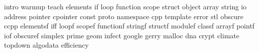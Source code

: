 intro
warmup
teach
elements
if
loop
function
scope
struct
object
array
string
io
address
pointer
cpointer
const
proto
namespace
cpp
template
error
stl
obscure
ccpp
elementsf
iff
loopf
scopef
functionf
stringf
structf
modulef
classf
arrayf
pointf
iof
obscuref
simplex
prime
geom
infect
google
gerry
malloc
dna
crypt
climate
topdown
algodata
efficiency
